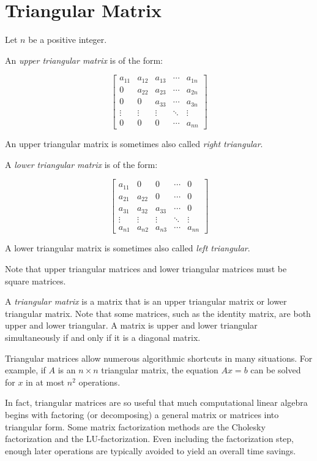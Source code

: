 \documentclass{article}
\begin{document}

\section{Triangular Matrix}

Let $n$ be a positive integer.

An \emph{upper triangular matrix} is of the form:

$$ \begin{bmatrix}
a_{11} & a_{12} & a_{13} & \cdots & a_{1n} \\
   0   & a_{22} & a_{23} & \cdots & a_{2n} \\
   0   &   0    & a_{33} & \cdots & a_{3n} \\
\vdots & \vdots & \vdots & \ddots & \vdots \\
   0   &   0    &    0   & \cdots & a_{nn}
\end{bmatrix} $$

An upper triangular matrix is sometimes also called \emph{right triangular}.

A \emph{lower triangular matrix} is of the form:

$$ \begin{bmatrix}
a_{11} &   0    &   0    & \cdots &    0   \\
a_{21} & a_{22} &   0    & \cdots &    0   \\
a_{31} & a_{32} & a_{33} & \cdots &    0   \\
\vdots & \vdots & \vdots & \ddots & \vdots \\
a_{n1} & a_{n2} & a_{n3} & \cdots & a_{nn} 
\end{bmatrix} $$

A lower triangular matrix is sometimes also called \emph{left triangular}.

Note that upper triangular matrices and lower triangular matrices must be square matrices.

A \emph{triangular matrix} is a matrix that is an upper triangular matrix or lower triangular matrix.  Note that some matrices, such as the identity matrix, are both upper and lower triangular.  A matrix is upper and lower triangular simultaneously if and only if it is a diagonal matrix.

Triangular matrices allow numerous algorithmic shortcuts in many situations. For example, if $A$ is an $n\times n$ triangular matrix, the equation $Ax=b$ can be solved for $x$ in at most $n^2$ operations.

In fact, triangular matrices are so useful that much computational linear algebra begins with factoring (or decomposing) a general matrix or matrices into triangular form.  Some matrix factorization methods are the Cholesky factorization and the LU-factorization. Even including the factorization step, enough later operations are typically avoided to yield an overall time savings.
\end{document}
